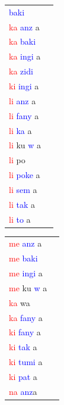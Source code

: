 \documentclass[output=paper,colorlinks,citecolor=brown]{langscibook}
\begin{document}
\begin{table}
\begin{minipage}[t]{.24\textwidth}
\begin{tabular}{ll} 
\lsptoprule
\textcolor{blue}{baki} \\ 
\textcolor{red}{ka} \textcolor{blue}{anz} a \\ 
\textcolor{red}{ka} \textcolor{blue}{baki} \\ 
\textcolor{red}{ka} \textcolor{blue}{ingi} a \\ 
\textcolor{red}{ka} \textcolor{blue}{zidi} \\ 
\textcolor{red}{ki} \textcolor{blue}{ingi} a \\ 
\textcolor{red}{li} \textcolor{blue}{anz} a \\ 
\textcolor{red}{li} \textcolor{blue}{fany} a \\
\textcolor{red}{li} \textcolor{blue}{ka} a \\
\textcolor{red}{li} ku \textcolor{blue}{w} a\\
\textcolor{red}{li} po \\ 
\textcolor{red}{li} \textcolor{blue}{poke} a \\ 
\textcolor{red}{li} \textcolor{blue}{sem} a \\
\textcolor{red}{li} \textcolor{blue}{tak} a \\ 
\textcolor{red}{li} \textcolor{blue}{to} a \\
\end{tabular}
\end{minipage}
\begin{minipage}[t]{.24\textwidth}
\begin{tabular}{ll} 
\textcolor{red}{me} \textcolor{blue}{anz} a \\ 
\textcolor{red}{me} \textcolor{blue}{baki} \\ 
\textcolor{red}{me} \textcolor{blue}{ingi} a \\ 
\textcolor{red}{me} ku \textcolor{blue}{w} a \\ 
\textcolor{red}{ka} wa \\ 
\textcolor{red}{ka} \textcolor{blue}{fany} a \\ 
\textcolor{red}{ki} \textcolor{blue}{fany} a \\ 
\textcolor{red}{ki} \textcolor{blue}{tak} a \\ 
\textcolor{red}{ki} \textcolor{blue}{tumi} a \\ 
\textcolor{red}{ki} \textcolor{blue}{pat} a \\ 
\textcolor{red}{na} \textcolor{blue}{anz}a \\ 

\end{tabular}
\end{minipage}
\end{table}
\end{document}
